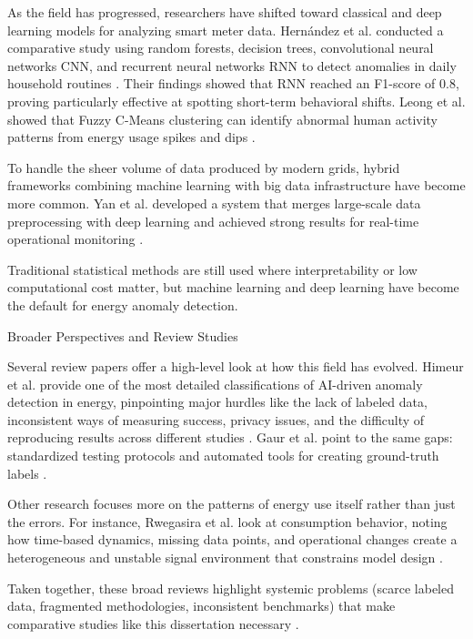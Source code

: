 ﻿\documentclass[12pt,reqno, twoside]{amsbook}
\makeatletter
\numberwithin{figure}{chapter}
\numberwithin{table}{chapter}
\numberwithin{equation}{chapter}
\def\subsection{\@startsection{subsection}{2}%
      \z@{.5\linespacing\@plus.7\linespacing}{.25\linespacing}%
      {\normalfont\bfseries\flushleft}}
\theoremstyle{plain}
\numberwithin{equation}{chapter}
\numberwithin{section}{chapter}
\makeatother
\begin{document}
As the field has progressed, researchers have shifted toward classical and deep learning models for analyzing smart meter data. Hernández et al. conducted a comparative study using random forests, decision trees, convolutional neural networks \ac{CNN}, and recurrent neural networks \ac{RNN} to detect anomalies in daily household routines \cite{hernandez_detection_2024}. Their findings showed that \ac{RNN} reached an F1-score of 0.8, proving particularly effective at spotting short-term behavioral shifts. Leong et al. showed that Fuzzy C-Means clustering can identify abnormal human activity patterns from energy usage spikes and dips \cite{leong_detection_2016}.

To handle the sheer volume of data produced by modern grids, hybrid frameworks combining machine learning with big data infrastructure have become more common. Yan et al. developed a system that merges large-scale data preprocessing with deep learning and achieved strong results for real-time operational monitoring \cite{yan_intelligent_2024}.

Traditional statistical methods are still used where interpretability or low computational cost matter, but machine learning and deep learning have become the default for energy anomaly detection.

\subsection{Broader Perspectives and Review Studies}

Several review papers offer a high-level look at how this field has evolved. Himeur et al. provide one of the most detailed classifications of \ac{AI}-driven anomaly detection in energy, pinpointing major hurdles like the lack of labeled data, inconsistent ways of measuring success, privacy issues, and the difficulty of reproducing results across different studies \cite{himeur_artificial_2021}. Gaur et al. point to the same gaps: standardized testing protocols and automated tools for creating ground-truth labels \cite{gaur_performance_2019}.

Other research focuses more on the patterns of energy use itself rather than just the errors. For instance, Rwegasira et al. look at consumption behavior, noting how time-based dynamics, missing data points, and operational changes create a heterogeneous and unstable signal environment that constrains model design \cite{rwegasira_time_2025}.

Taken together, these broad reviews highlight systemic problems (scarce labeled data, fragmented methodologies, inconsistent benchmarks) that make comparative studies like this dissertation necessary \cite{himeur_artificial_2021,gaur_performance_2019}.
\end{document}
